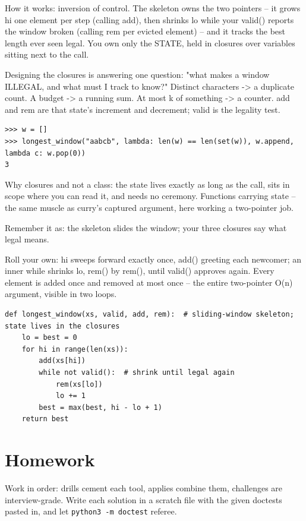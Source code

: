 \documentclass[10pt,letterpaper]{book}
\begin{document}
How it works: inversion of control. The skeleton owns the two pointers -- it grows hi one element per step (calling add), then shrinks lo while your valid() reports the window broken (calling rem per evicted element) -- and it tracks the best length ever seen legal. You own only the STATE, held in closures over variables sitting next to the call.


Designing the closures is answering one question: "what makes a window ILLEGAL, and what must I track to know?" Distinct characters -> a duplicate count. A budget -> a running sum. At most k of something -> a counter. add and rem are that state's increment and decrement; valid is the legality test.

\begin{lstlisting}[style=ex]
>>> w = []
>>> longest_window("aabcb", lambda: len(w) == len(set(w)), w.append, lambda c: w.pop(0))
3
\end{lstlisting}

Why closures and not a class: the state lives exactly as long as the call, sits in scope where you can read it, and needs no ceremony. Functions carrying state -- the same muscle as curry's captured argument, here working a two-pointer job.


Remember it as: the skeleton slides the window; your three closures say what legal means.


Roll your own: hi sweeps forward exactly once, add() greeting each newcomer; an inner while shrinks lo, rem() by rem(), until valid() approves again. Every element is added once and removed at most once -- the entire two-pointer O(n) argument, visible in two loops.

\begin{lstlisting}[style=ex]
def longest_window(xs, valid, add, rem):  # sliding-window skeleton; state lives in the closures
    lo = best = 0
    for hi in range(len(xs)):
        add(xs[hi])
        while not valid():  # shrink until legal again
            rem(xs[lo])
            lo += 1
        best = max(best, hi - lo + 1)
    return best
\end{lstlisting}

\section{Homework}
Work in order: drills cement each tool, applies combine them,
challenges are interview-grade. Write each solution in a scratch file with
the given doctests pasted in, and let \texttt{python3 -m doctest} referee.
\end{document}
